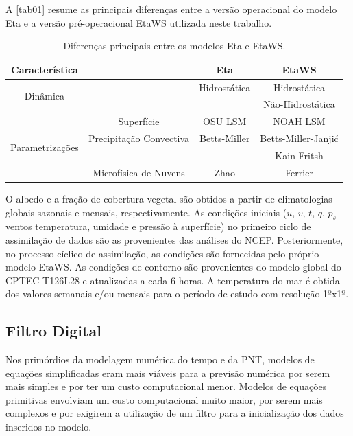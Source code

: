 A \autoref{tab01} resume as principais diferenças entre a versão operacional do modelo Eta e a versão pré-operacional EtaWS utilizada neste trabalho.

\begin{table}[!hbp]
\caption{Diferenças principais entre os modelos Eta e EtaWS.}
\label{tab01}
\centering
\begin{tabular}{c|c|c|c}
\hline
Característica                       &                         & Eta               & EtaWS              \\
\hline
\multirow{2}{2.8cm}{Dinâmica}        &                         & Hidrostática      & Hidrostática       \\
                                     &                         &                   & Não-Hidrostática   \\
\hline
                                     & Superfície              & OSU LSM           & NOAH LSM           \\ 
\multirow{2}{2.8cm}{Parametrizações} & Precipitação Convectiva & Betts-Miller      & Betts-Miller-Janjić\\
                                     &                         &                   & Kain-Fritsh        \\
                                     & Microfísica de Nuvens   & Zhao              & Ferrier            \\
\hline
\end{tabular}
\end{table}

O albedo e a fração de cobertura vegetal são obtidos a partir de climatologias globais sazonais e mensais, respectivamente. As condições iniciais ($u$, $v$, $t$, $q$, $p_{s}$ - ventos temperatura, umidade e pressão à superfície) no primeiro ciclo de assimilação de dados são as provenientes das análises do NCEP. Posteriormente, no processo cíclico de assimilação, as condições são fornecidas pelo próprio modelo EtaWS. As condições de contorno são provenientes do modelo global do CPTEC T126L28 e atualizadas a cada 6 horas. A temperatura do mar é obtida dos valores semanais e/ou mensais para o período de estudo com resolução 1ºx1º.

\subsection{Filtro Digital}

Nos primórdios da modelagem numérica do tempo e da PNT, modelos de equações simplificadas eram mais viáveis para a previsão numérica por serem mais simples e por ter um custo computacional menor. Modelos de equações primitivas envolviam um custo computacional muito maior, por serem mais complexos e por exigirem a utilização de um filtro para a inicialização dos dados inseridos no modelo. 

